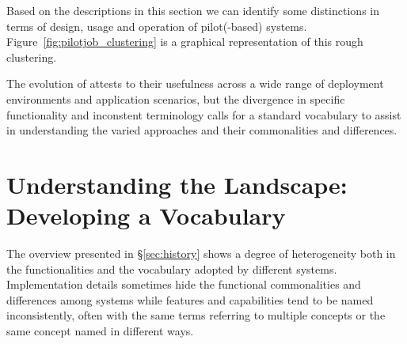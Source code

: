 \documentclass{sig-alternate}
\begin{document}

Based on the descriptions in this section we can identify some distinctions in
terms of design, usage and operation of pilot(-based) systems.
Figure~\ref{fig:pilotjob_clustering} is a graphical representation of this
rough clustering.

The evolution of \pilotjobs attests to their usefulness across a wide range of
deployment environments and application scenarios, but the divergence in
specific functionality and inconstent terminology calls for a standard
vocabulary to assist in understanding the varied approaches and their
commonalities and differences.





\section{Understanding the Landscape: Developing a Vocabulary}
\label{sec:vocab}

The overview presented in \S\ref{sec:history} shows a degree of
heterogeneity both in the functionalities and the vocabulary adopted by
different \pilotjob systems. Implementation details sometimes hide the
functional commonalities and differences among \pilotjobs systems while
features and capabilities tend to be named inconsistently, often with
the same terms referring to multiple concepts or the same concept named
in different ways.
\end{document}
